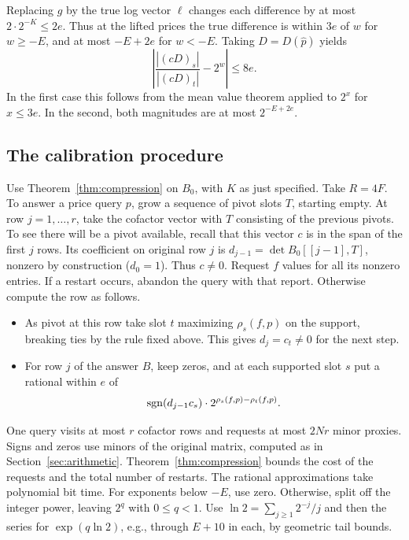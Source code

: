 Replacing \(g\) by the true log vector \(\ell\) changes each
difference by at most \(2\cdot2^{-K}\le2e\). Thus at the lifted
prices the true difference is within \(3e\) of \(w\) for
\(w\ge-E\), and at most \(-E+2e\) for \(w<-E\). Taking
\(D=D(\widehat p)\) yields
\begin{equation}\label{eq:pivot-estimate}
 \left|\frac{|(cD)_s|}{|(cD)_t|}-2^w\right|\le8e.
\end{equation}
In the first case this follows from the mean value theorem applied to
\(2^x\) for \(x\le3e\). In the second, both magnitudes are at most
\(2^{-E+2e}\).

\subsection{The calibration procedure}

Use Theorem~\ref{thm:compression}
on \(B_0\), with \(K\) as just specified. Take \(R=4F\).
To answer a price query \(p\), grow a sequence of pivot slots \(T\), starting empty.
At row \(j=1,\ldots,r\), take the cofactor vector with
\(T\) consisting of the previous pivots.
To see there will be a pivot available, recall that this vector \(c\)
is in the span of the first \(j\) rows. Its coefficient on original row \(j\) is \(d_{j-1}=\det B_0[[j-1],T]\), nonzero
by construction (\(d_0=1\)). Thus \(c\ne0\).
Request \(f\) values for all its nonzero entries.
If a restart occurs, abandon the query with that report.
Otherwise compute the row as follows.
\begin{itemize}
 \item As pivot at this row take slot \(t\) maximizing
 \(\rho_s(f,p)\) on the support, breaking ties by the rule fixed above.
 This gives \(d_j=c_t\ne0\) for the next step.
 \item For row \(j\) of the answer \(B\),
 keep zeros, and at each supported slot \(s\) put a rational
 within \(e\) of
 \[
    \operatorname{sgn}(d_{j-1}c_s)\cdot 2^{\rho_s(f,p)-\rho_t(f,p)}.
 \]
\end{itemize}
One query visits at most \(r\) cofactor rows and requests at most
\(2Nr\) minor proxies. Signs and zeros use minors of the original
matrix, computed as in Section~\ref{sec:arithmetic}.
Theorem~\ref{thm:compression} bounds the cost of the requests and
the total number of restarts.
The rational approximations take polynomial bit time.
For exponents below \(-E\), use zero.
Otherwise, split off the integer power, leaving \(2^q\) with
\(0\le q<1\).
Use \(\ln 2=\sum_{j\ge1}2^{-j}/j\) and then the series for
\(\exp(q\ln 2)\), e.g., through \(E+10\) in each,
by geometric tail bounds.

